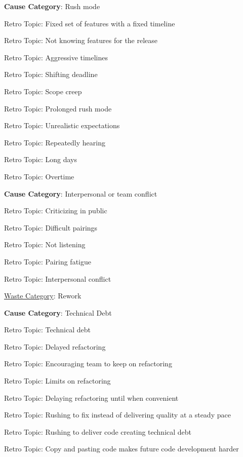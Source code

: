 \quad \textbf{Cause Category}: Rush mode

\quad \quad Retro Topic: Fixed set of features with a fixed timeline

\quad \quad Retro Topic: Not knowing features for the release

\quad \quad Retro Topic: Aggressive timelines

\quad \quad Retro Topic: Shifting deadline

\quad \quad Retro Topic: Scope creep

\quad \quad Retro Topic: Prolonged rush mode

\quad \quad Retro Topic: Unrealistic expectations

\quad \quad Retro Topic: Repeatedly hearing 

\quad \quad Retro Topic: Long days

\quad \quad Retro Topic: Overtime

\quad \textbf{Cause Category}:  Interpersonal or team conflict

\quad \quad Retro Topic: Criticizing in public

\quad \quad Retro Topic: Difficult pairings

\quad \quad Retro Topic: Not listening

\quad \quad Retro Topic: Pairing fatigue

\quad \quad Retro Topic: Interpersonal conflict









\underline{Waste Category}: Rework

\quad \textbf{Cause Category}: Technical Debt

\quad \quad Retro Topic: Technical debt

\quad \quad Retro Topic: Delayed refactoring

\quad \quad Retro Topic: Encouraging team to keep on refactoring

\quad \quad Retro Topic: Limits on refactoring

\quad \quad Retro Topic: Delaying refactoring until when convenient

\quad \quad Retro Topic: Rushing to fix  instead of delivering quality at a steady pace

\quad \quad Retro Topic: Rushing to deliver code creating technical debt

\quad \quad Retro Topic: Copy and pasting code makes future code development harder

